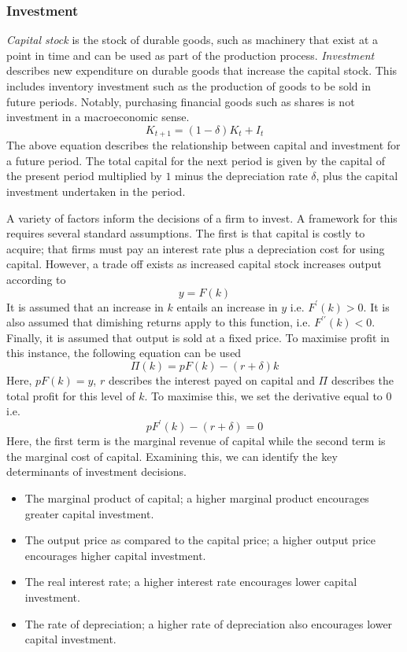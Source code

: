 \documentclass[12pt]{report}
\begin{document}
\begin{flushleft}
\subsubsection*{Investment}

\textit{Capital stock} is the stock of durable goods, such as machinery that
exist at a point in time and can be used as part of the production process.
\textit{Investment} describes new expenditure on durable goods that increase
the capital stock. This includes inventory investment such as the production of
goods to be sold in future periods. Notably, purchasing financial goods such
as shares is not investment in a macroeconomic sense.
\[K_{t + 1} = (1 - \delta)K_t + I_t\]
The above equation describes the relationship between capital and investment 
for a future period. The total capital for the next period is given by the 
capital of the present period multiplied by \(1\) minus the depreciation rate
\(\delta\), plus the capital investment undertaken in the period. \par
A variety of factors inform the decisions of a firm to invest. A framework for
this requires several standard assumptions. The first is that capital is costly
to acquire; that firms must pay an interest rate plus a depreciation cost for
using capital. However, a trade off exists as increased capital stock increases
output according to 
\[y = F(k)\]
It is assumed that an increase in \(k\) entails an increase in \(y\) i.e. 
\(F^\prime(k) > 0\). It is also assumed that dimishing returns apply to this
function, i.e. \(F^{\prime\prime}(k) < 0\). Finally, it is assumed that output
is sold at a fixed price. To maximise profit in this instance, the following
equation can be used
\[\Pi(k) = pF(k) - (r + \delta)k\]
Here, \(pF(k) = y\), \(r\) describes the interest payed on capital and \(\Pi\)
describes the total profit for this level of \(k\). To maximise this, we set
the derivative equal to \(0\) i.e.
\[pF^\prime(k) - (r + \delta) = 0\]
Here, the first term is the marginal revenue of capital while the second term
is the marginal cost of capital. Examining this, we can identify the key
determinants of investment decisions.
\begin{itemize}
    \item The marginal product of capital; a higher marginal product encourages
        greater capital investment.
    \item The output price as compared to the capital price; a higher output
        price encourages higher capital investment.
    \item The real interest rate; a higher interest rate encourages lower 
        capital investment.
    \item The rate of depreciation; a higher rate of depreciation also 
        encourages lower capital investment.
\end{itemize}


\end{flushleft}
\end{document}
